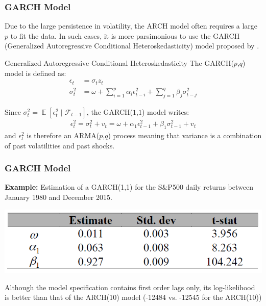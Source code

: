 \documentclass[xcolor=dvipsnames, english, 8pt]{beamer}
\DeclareMathOperator{\E}{\mathbb{E}}
\begin{document}
\begin{frame}
    \frametitle{GARCH Model}
    Due to the large persistence in volatility, the ARCH model often requires a large $p$ to
fit the data. In such cases, it is more parsimonious to use the GARCH ({\color{ubRed}Generalized
Autoregressive Conditional Heteroskedasticity}) model proposed by \cite{Bollerslev1986}.\vspace{0.25cm}\\
\begin{block}{Generalized Autoregressive Conditional Heteroskedasticity}
 The {\color{ubRed}GARCH($p$,$q$)}
model is defined as:
\begin{align}
    \epsilon_t &= \sigma_t z_t\\
    \sigma_t^2 &= \omega +\sum\limits_{i=1}^p \alpha_i  \epsilon_{t-i}^2 + \sum\limits_{j=1}^q \beta_j  \sigma_{t-j}^2
\end{align}
\end{block}
Since $\sigma_t^2 = \E\left[\epsilon_t^2 \mid \mathscr{F}_{t-1}\right]$, the GARCH($1$,$1$) model writes:
\begin{align}
    \epsilon_t^2 = \sigma_t^2 + v_t = \omega + \alpha_1 \epsilon_{t-1}^2 + \beta_1\sigma_{t-1}^2 + v_t
\end{align}
and $\epsilon_t^2$ is therefore an ARMA($p$,$q$) process meaning that variance is a combination of past volatilities and past shocks.
\end{frame}

\begin{frame}
    \frametitle{GARCH Model}
    \textbf{Example:} Estimation of a GARCH(1,1) for the S\&P500 daily returns between January 1980 and
December 2015.
\begin{center}
    \includegraphics[scale=0.4]{GARCH1}
\end{center}
Although the model specification contains first order lags only, its log-likelihood is better than that of the ARCH(10) model (-12484 vs. -12545 for the ARCH(10))
\end{frame}
\end{document}
